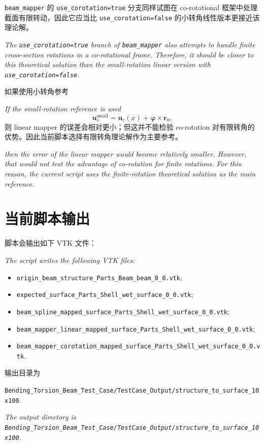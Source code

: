 \documentclass[UTF8,a4paper,11pt]{ctexart}
\begin{document}
\texttt{beam\_mapper} 的 \texttt{use\_corotation=true} 分支同样试图在 co-rotational 框架中处理截面有限转动，因此它应当比 \texttt{use\_corotation=false} 的小转角线性版本更接近该理论解。
\par\noindent\emph{The \texttt{use\_corotation=true} branch of \texttt{beam\_mapper} also attempts to handle finite cross-section rotations in a co-rotational frame.
Therefore, it should be closer to this theoretical solution than the small-rotation linear version with \texttt{use\_corotation=false}.}

如果使用小转角参考
\par\noindent\emph{If the small-rotation reference is used}
\begin{equation}
  \bm{u}_s^{\mathrm{small}}
  =
  \bm{u}_c(x)
  +
  \bm{\varphi}\times\bm{r}_0,
\end{equation}
则 linear mapper 的误差会相对更小；但这并不能检验 co-rotation 对有限转角的优势。因此当前脚本选择有限转角理论解作为主要参考。
\par\noindent\emph{then the error of the linear mapper would become relatively smaller.
However, that would not test the advantage of co-rotation for finite rotations.
For this reason, the current script uses the finite-rotation theoretical solution as the main reference.}

\section{当前脚本输出}

脚本会输出如下 VTK 文件：
\par\noindent\emph{The script writes the following VTK files:}
\begin{itemize}
  \item \texttt{origin\_beam\_structure\_Parts\_Beam\_beam\_0\_0.vtk};
  \item \texttt{expected\_surface\_Parts\_Shell\_wet\_surface\_0\_0.vtk};
  \item \texttt{beam\_spline\_mapped\_surface\_Parts\_Shell\_wet\_surface\_0\_0.vtk};
  \item \texttt{beam\_mapper\_linear\_mapped\_surface\_Parts\_Shell\_wet\_surface\_0\_0.vtk};
  \item \texttt{beam\_mapper\_corotation\_mapped\_surface\_Parts\_Shell\_wet\_surface\_0\_0.vtk}.
\end{itemize}

输出目录为
\begin{center}
\texttt{Bending\_Torsion\_Beam\_Test\_Case/TestCase\_Output/structure\_to\_surface\_10x100}.
\end{center}
\noindent\emph{The output directory is
\texttt{Bending\_Torsion\_Beam\_Test\_Case/TestCase\_Output/structure\_to\_surface\_10x100}.}
\end{document}
